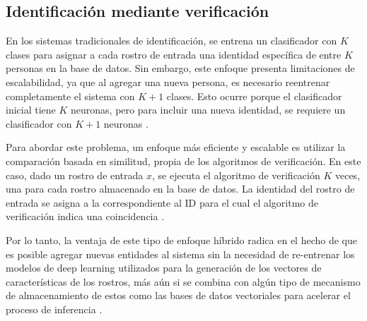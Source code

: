 \subsection{Identificación mediante verificación}
En los sistemas tradicionales de identificación, se entrena un clasificador con $K$ clases para asignar a cada rostro de entrada una identidad específica de entre $K$ personas en la base de datos. Sin embargo, este enfoque presenta limitaciones de escalabilidad, ya que al agregar una nueva persona, es necesario reentrenar completamente el sistema con $K+1$ clases. Esto ocurre porque el clasificador inicial tiene $K$ neuronas, pero para incluir una nueva identidad, se requiere un clasificador con $K+1$ neuronas \cite{L15}.

\vspace{\baselineskip}

Para abordar este problema, un enfoque más eficiente y escalable es utilizar la comparación basada en similitud, propia de los algoritmos de verificación. En este caso, dado un rostro de entrada $x$, se ejecuta el algoritmo de verificación $K$ veces, una para cada rostro almacenado en la base de datos. La identidad del rostro de entrada se asigna a la correspondiente al ID para el cual el algoritmo de verificación indica una coincidencia \cite{L15}.

Por lo tanto, la ventaja de este tipo de enfoque híbrido radica en el hecho de que es posible agregar nuevas entidades al sistema sin la necesidad de re-entrenar los modelos de deep learning utilizados para la generación de los vectores de características de los rostros, más aún si se combina con algún tipo de mecanismo de almacenamiento de estos como las bases de datos vectoriales para acelerar el proceso de inferencia \cite{L17}.





